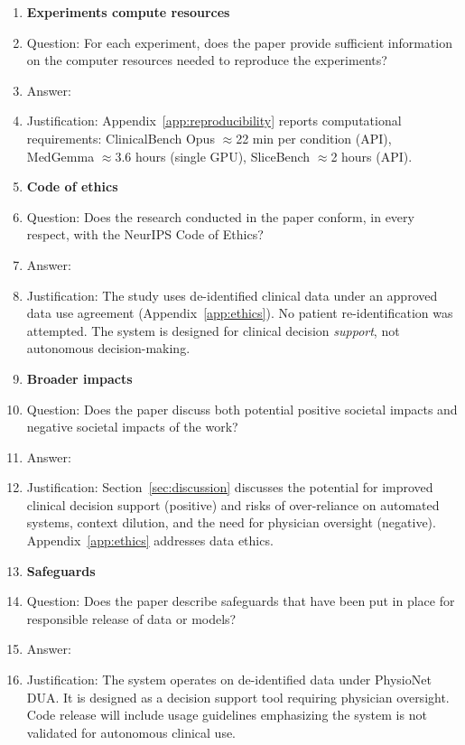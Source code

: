 \begin{enumerate}
\item {\bf Experiments compute resources}
    \item[] Question: For each experiment, does the paper provide sufficient information on the computer resources needed to reproduce the experiments?
    \item[] Answer: \answerYes{}
    \item[] Justification: Appendix~\ref{app:reproducibility} reports computational requirements: ClinicalBench Opus $\approx$22 min per condition (API), MedGemma $\approx$3.6 hours (single GPU), SliceBench $\approx$2 hours (API).

\item {\bf Code of ethics}
    \item[] Question: Does the research conducted in the paper conform, in every respect, with the NeurIPS Code of Ethics?
    \item[] Answer: \answerYes{}
    \item[] Justification: The study uses de-identified clinical data under an approved data use agreement (Appendix~\ref{app:ethics}). No patient re-identification was attempted. The system is designed for clinical decision \emph{support}, not autonomous decision-making.

\item {\bf Broader impacts}
    \item[] Question: Does the paper discuss both potential positive societal impacts and negative societal impacts of the work?
    \item[] Answer: \answerYes{}
    \item[] Justification: Section~\ref{sec:discussion} discusses the potential for improved clinical decision support (positive) and risks of over-reliance on automated systems, context dilution, and the need for physician oversight (negative). Appendix~\ref{app:ethics} addresses data ethics.

\item {\bf Safeguards}
    \item[] Question: Does the paper describe safeguards that have been put in place for responsible release of data or models?
    \item[] Answer: \answerYes{}
    \item[] Justification: The system operates on de-identified data under PhysioNet DUA. It is designed as a decision support tool requiring physician oversight. Code release will include usage guidelines emphasizing the system is not validated for autonomous clinical use.


\end{enumerate}
